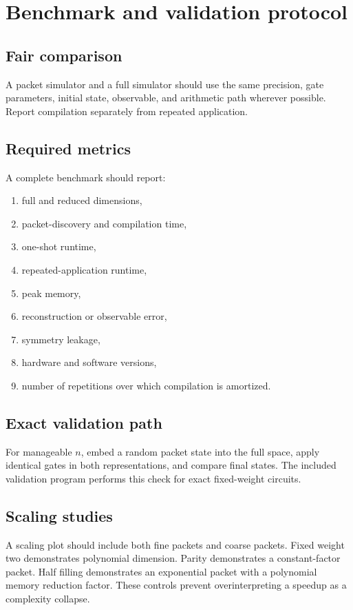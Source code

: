 \chapter{Benchmark and validation protocol}
\label{ch:benchmark-protocol}

\section{Fair comparison}
A packet simulator and a full simulator should use the same precision, gate parameters, initial state, observable, and arithmetic path wherever possible. Report compilation separately from repeated application.

\section{Required metrics}
A complete benchmark should report:

\begin{enumerate}
\item full and reduced dimensions,
\item packet-discovery and compilation time,
\item one-shot runtime,
\item repeated-application runtime,
\item peak memory,
\item reconstruction or observable error,
\item symmetry leakage,
\item hardware and software versions,
\item number of repetitions over which compilation is amortized.
\end{enumerate}

\section{Exact validation path}
For manageable $n$, embed a random packet state into the full space, apply identical gates in both representations, and compare final states. The included validation program performs this check for exact fixed-weight circuits.

\section{Scaling studies}
A scaling plot should include both fine packets and coarse packets. Fixed weight two demonstrates polynomial dimension. Parity demonstrates a constant-factor packet. Half filling demonstrates an exponential packet with a polynomial memory reduction factor. These controls prevent overinterpreting a speedup as a complexity collapse.

